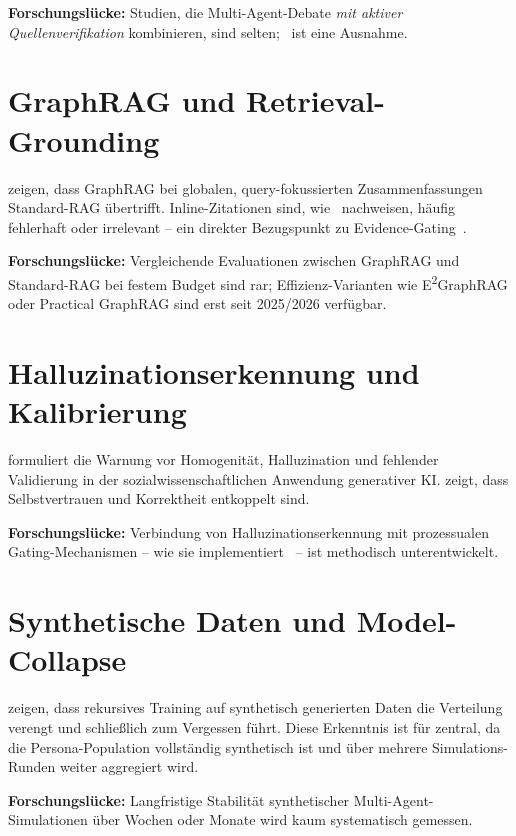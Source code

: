 \textbf{Forschungslücke:} Studien, die Multi-Agent-Debate \emph{mit aktiver Quellenverifikation} kombinieren, sind selten;~\cite{zenodo-agora} ist eine Ausnahme.

\section{GraphRAG und Retrieval-Grounding}\label{sec:graphrag}

\cite{edge2024graphrag} zeigen, dass GraphRAG bei globalen, query-fokussierten Zusammenfassungen Standard-RAG übertrifft. Inline-Zitationen sind, wie~\cite{citednotverified} nachweisen, häufig fehlerhaft oder irrelevant -- ein direkter Bezugspunkt zu \agoras{} Evidence-Gating~\cite{adr-0002}.

\textbf{Forschungslücke:} Vergleichende Evaluationen zwischen GraphRAG und Standard-RAG bei festem Budget sind rar; Effizienz-Varianten wie E\textsuperscript{2}GraphRAG oder Practical GraphRAG sind erst seit 2025/2026 verfügbar.

\section{Halluzinationserkennung und Kalibrierung}\label{sec:halluzination}

\cite{bail2024genai} formuliert die Warnung vor Homogenität, Halluzination und fehlender Validierung in der sozialwissenschaftlichen Anwendung generativer KI. \cite{consistency2024} zeigt, dass Selbstvertrauen und Korrektheit entkoppelt sind.

\textbf{Forschungslücke:} Verbindung von Halluzinationserkennung mit prozessualen Gating-Mechanismen -- wie \agora{} sie implementiert~\cite{adr-0002} -- ist methodisch unterentwickelt.

\section{Synthetische Daten und Model-Collapse}\label{sec:modelcollapse}

\cite{shumailov2024curse} zeigen, dass rekursives Training auf synthetisch generierten Daten die Verteilung verengt und schließlich zum Vergessen führt. Diese Erkenntnis ist für \agora{} zentral, da die Persona-Population vollständig synthetisch ist und über mehrere Simulations-Runden weiter aggregiert wird.

\textbf{Forschungslücke:} Langfristige Stabilität synthetischer Multi-Agent-Simulationen über Wochen oder Monate wird kaum systematisch gemessen.

